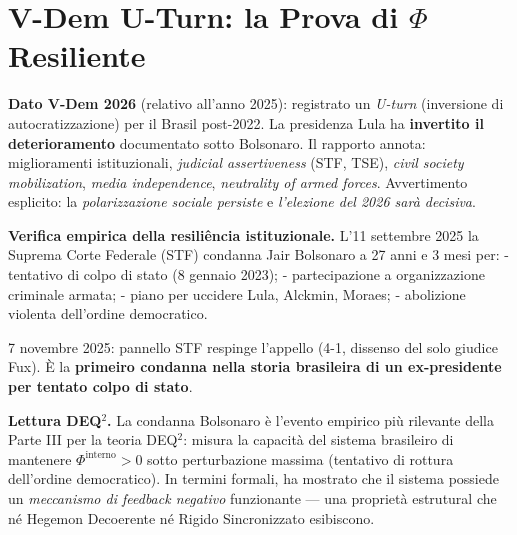 \section{\texorpdfstring{V-Dem U-Turn: la Prova di \(\Phi\)
Resiliente}{V-Dem U-Turn: la Prova di \textbackslash Phi Resiliente}}\label{v-dem-u-turn-la-prova-di-phi-resiliente}

\Proved{} \textbf{Dato V-Dem 2026} (relativo all'anno 2025): registrato
un \emph{U-turn} (inversione di autocratizzazione) per il Brasil
post-2022. La presidenza Lula ha \textbf{invertito il deterioramento}
documentato sotto Bolsonaro. Il rapporto annota: miglioramenti
istituzionali, \emph{judicial assertiveness} (STF, TSE), \emph{civil
society mobilization}, \emph{media independence}, \emph{neutrality of
armed forces}. Avvertimento esplicito: la \emph{polarizzazione sociale
persiste} e \emph{l'elezione del 2026 sarà decisiva}.

\Proved{} \textbf{Verifica empirica della resiliência istituzionale.}
L'11 settembre 2025 la Suprema Corte Federale (STF) condanna Jair
Bolsonaro a 27 anni e 3 mesi per: - tentativo di colpo di stato (8
gennaio 2023); - partecipazione a organizzazione criminale armata; -
piano per uccidere Lula, Alckmin, Moraes; - abolizione violenta
dell'ordine democratico.

7 novembre 2025: pannello STF respinge l'appello (4-1, dissenso del solo
giudice Fux). È la \textbf{primeiro condanna nella storia brasileira di un
ex-presidente per tentato colpo di stato}.

\Hypoth{} \textbf{Lettura DEQ$^2$. } La condanna Bolsonaro è l'evento
empirico più rilevante della Parte III per la teoria DEQ$^2$: misura la
capacità del sistema brasileiro di mantenere
\(\Phi^{\text{interno}} > 0\) sotto perturbazione massima (tentativo di
rottura dell'ordine democratico). In termini formali, ha mostrato che il
sistema possiede un \emph{meccanismo di feedback negativo} funzionante
--- una proprietà estrutural che né Hegemon Decoerente né Rigido
Sincronizzato esibiscono.

